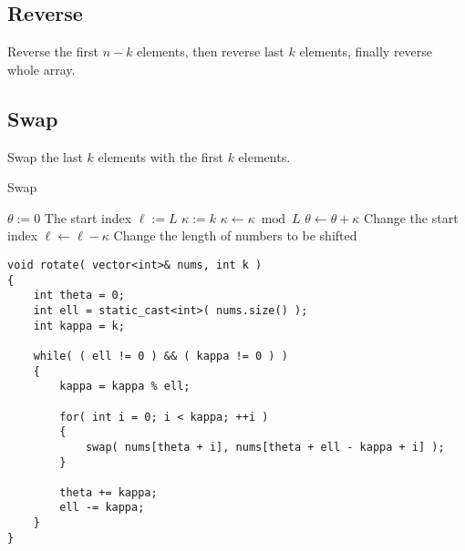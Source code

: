 \subsection{Reverse}
Reverse the first $n-k$ elements, then reverse last $k$ elements, finally reverse whole array.
\subsection{Swap}
Swap the last $k$ elements with the first $k$ elements.
\begin{algorithm}[H]
\caption{Swap}
\begin{algorithmic}[1]
\State $\theta:=0$ \Comment The start index
\State $\ell:=L$
\State $\kappa:=k$
\State $\kappa\gets \kappa\bmod L$
\State {}
\State $\theta\gets \theta + \kappa$ \Comment Change the start index
\State $\ell\gets \ell - \kappa$ \Comment Change the length of numbers to be shifted
\EndFor
\EndWhile
\EndProcedure
\end{algorithmic}
\end{algorithm}
\begin{lstlisting}[style=customc, caption={Swap}]
void rotate( vector<int>& nums, int k )
{
    int theta = 0;
    int ell = static_cast<int>( nums.size() );
    int kappa = k;

    while( ( ell != 0 ) && ( kappa != 0 ) )
    {
        kappa = kappa % ell;

        for( int i = 0; i < kappa; ++i )
        {
            swap( nums[theta + i], nums[theta + ell - kappa + i] );
        }

        theta += kappa;
        ell -= kappa;
    }
}
\end{lstlisting}